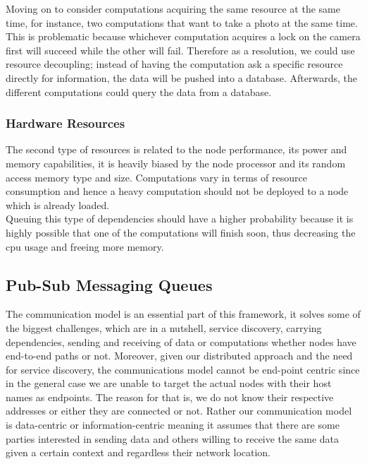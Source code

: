   \noindent Moving on to consider computations acquiring the same resource at the same time, for instance, two computations that want to take a photo at the same time. This is problematic because whichever computation acquires a lock on the camera first will succeed while the other will fail. Therefore as a resolution, we could use resource decoupling; instead of having the computation ask a specific resource directly for information, the  data will be pushed into a database. Afterwards, the different computations could query the data from a database.
  
  

\subsubsection{Hardware Resources }

The second type of resources is related to the node performance, its power and memory capabilities, it is heavily biased by the  node processor  and its random access memory type and size. Computations vary in terms of resource consumption and hence a heavy computation should not be deployed to a node which is already loaded. \\

\noindent Queuing this type of dependencies should have a higher probability because it is highly possible that one of the computations will finish soon, thus decreasing the cpu usage and freeing more memory.







\subsection{Pub-Sub Messaging Queues}\label{subsec:pub-sub}

The communication model is an essential part of this framework, it solves some of the biggest challenges, which are in a nutshell, service discovery, carrying dependencies, sending and receiving of data or computations whether nodes have  end-to-end paths or not. Moreover, given our distributed approach and the need for service discovery, the communications model cannot be  end-point centric since in the general case we are unable to target the actual nodes with their host names as endpoints. The reason for that is, we do not know their respective addresses or either they are connected or not. Rather our communication model is data-centric or information-centric meaning it assumes that there are some parties interested in sending data and others willing to receive the same data given a certain context and regardless their network location. \\

